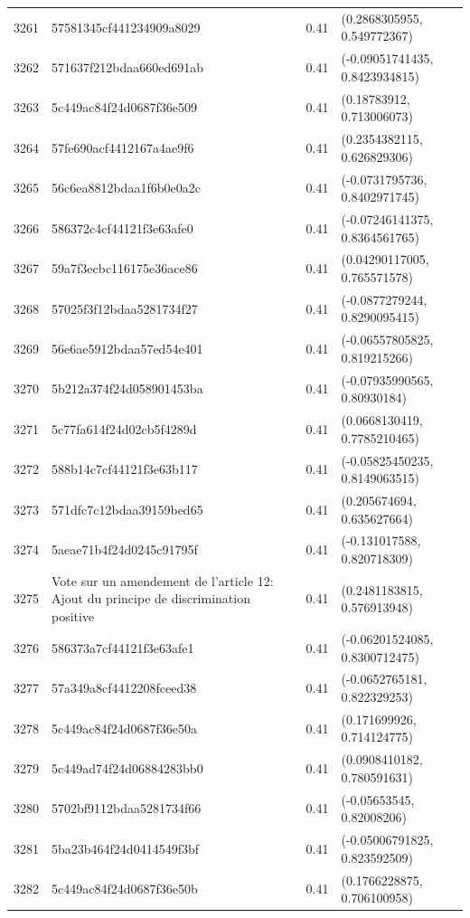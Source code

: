 \begin{table}[ht]
\begin{tabular}{rlrl}
  3261 & 57581345cf441234909a8029 & 0.41 & (0.2868305955, 0.549772367) \\ 
  3262 & 571637f212bdaa660ed691ab & 0.41 & (-0.09051741435, 0.8423934815) \\ 
  3263 & 5c449ac84f24d0687f36e509 & 0.41 & (0.18783912, 0.713006073) \\ 
  3264 & 57fe690acf4412167a4ae9f6 & 0.41 & (0.2354382115, 0.626829306) \\ 
  3265 & 56c6ea8812bdaa1f6b0e0a2c & 0.41 & (-0.0731795736, 0.8402971745) \\ 
  3266 & 586372c4cf44121f3e63afe0 & 0.41 & (-0.07246141375, 0.8364561765) \\ 
  3267 & 59a7f3ecbc116175e36ace86 & 0.41 & (0.04290117005, 0.765571578) \\ 
  3268 & 57025f3f12bdaa5281734f27 & 0.41 & (-0.0877279244, 0.8290095415) \\ 
  3269 & 56e6ae5912bdaa57ed54e401 & 0.41 & (-0.06557805825, 0.819215266) \\ 
  3270 & 5b212a374f24d058901453ba & 0.41 & (-0.07935990565, 0.80930184) \\ 
  3271 & 5c77fa614f24d02cb5f4289d & 0.41 & (0.0668130419, 0.7785210465) \\ 
  3272 & 588b14c7cf44121f3e63b117 & 0.41 & (-0.05825450235, 0.8149063515) \\ 
  3273 & 571dfc7c12bdaa39159bed65 & 0.41 & (0.205674694, 0.635627664) \\ 
  3274 & 5aeae71b4f24d0245c91795f & 0.41 & (-0.131017588, 0.820718309) \\ 
  3275 & Vote sur un amendement de l'article 12: Ajout du principe de discrimination positive & 0.41 & (0.2481183815, 0.576913948) \\ 
  3276 & 586373a7cf44121f3e63afe1 & 0.41 & (-0.06201524085, 0.8300712475) \\ 
  3277 & 57a349a8cf4412208fceed38 & 0.41 & (-0.0652765181, 0.822329253) \\ 
  3278 & 5c449ac84f24d0687f36e50a & 0.41 & (0.171699926, 0.714124775) \\ 
  3279 & 5c449ad74f24d06884283bb0 & 0.41 & (0.0908410182, 0.780591631) \\ 
  3280 & 5702bf9112bdaa5281734f66 & 0.41 & (-0.05653545, 0.82008206) \\ 
  3281 & 5ba23b464f24d0414549f3bf & 0.41 & (-0.05006791825, 0.823592509) \\ 
  3282 & 5c449ac84f24d0687f36e50b & 0.41 & (0.1766228875, 0.706100958) \\ 

\end{tabular}
\end{table}
